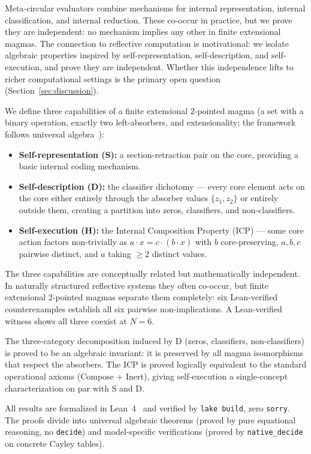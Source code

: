 \documentclass[sigconf,screen,review,anonymous]{acmart}
\newcommand{\dotop}{\cdot}
\begin{document}
Meta-circular evaluators combine mechanisms for internal representation, internal classification, and internal reduction. These co-occur in practice, but we prove they are independent: no mechanism implies any other in finite extensional magmas. The connection to reflective computation is motivational: we isolate algebraic properties inspired by self-representation, self-description, and self-execution, and prove they are independent. Whether this independence lifts to richer computational settings is the primary open question (Section~\ref{sec:discussion}).

We define three capabilities of a finite extensional 2-pointed magma (a set with a binary operation, exactly two left-absorbers, and extensionality; the framework follows universal algebra~\cite{burris81}):

\begin{itemize}
  \item \textbf{Self-representation (S):} a section-retraction pair on the core, providing a basic internal coding mechanism.
  \item \textbf{Self-description (D):} the classifier dichotomy — every core element acts on the core either entirely through the absorber values $\{z_1, z_2\}$ or entirely outside them, creating a partition into zeros, classifiers, and non-classifiers.
  \item \textbf{Self-execution (H):} the Internal Composition Property (ICP) — some core action factors non-trivially as $a \dotop x = c \dotop (b \dotop x)$ with $b$ core-preserving, $a, b, c$ pairwise distinct, and $a$ taking $\geq 2$ distinct values.
\end{itemize}

The three capabilities are conceptually related but mathematically independent. In naturally structured reflective systems they often co-occur, but finite extensional 2-pointed magmas separate them completely: six Lean-verified counterexamples establish all six pairwise non-implications. A Lean-verified witness shows all three coexist at $N\!=\!6$.

The three-category decomposition induced by D (zeros, classifiers, non-classifiers) is proved to be an algebraic invariant: it is preserved by all magma isomorphisms that respect the absorbers. The ICP is proved logically equivalent to the standard operational axioms (Compose + Inert), giving self-execution a single-concept characterization on par with S and D.

All results are formalized in Lean~4~\cite{moura21} and verified by \texttt{lake build}, zero \texttt{sorry}. The proofs divide into universal algebraic theorems (proved by pure equational reasoning, no \texttt{decide}) and model-specific verifications (proved by \texttt{native\_decide} on concrete Cayley tables).
\end{document}
